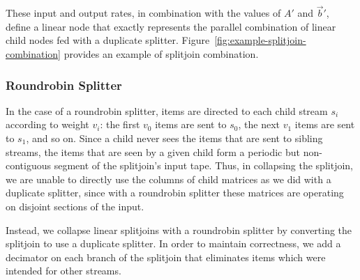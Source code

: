 \documentclass{sig-alternate}
\begin{document}
{These input and output rates, in combination with the values of $A'$
and $\vec{b}'$, define a linear node that exactly represents the
parallel combination of linear child nodes fed with a duplicate
splitter. Figure~\ref{fig:example-splitjoin-combination} provides an
example of splitjoin combination.



\subsubsection{Roundrobin Splitter}

In the case of a roundrobin splitter, items are directed to each child
stream $s_i$ according to weight $v_i$: the first $v_0$ items are sent
to $s_0$, the next $v_1$ items are sent to $s_1$, and so on.  Since a
child never sees the items that are sent to sibling streams, the items
that are seen by a given child form a periodic but non-contiguous
segment of the splitjoin's input tape.  Thus, in collapsing the
splitjoin, we are unable to directly use the columns of child matrices
as we did with a duplicate splitter, since with a roundrobin splitter
these matrices are operating on disjoint sections of the input.

Instead, we collapse linear splitjoins with a roundrobin splitter by
converting the splitjoin to use a duplicate splitter.  In order to
maintain correctness, we add a decimator on each branch
of the splitjoin that eliminates items which were intended for other
streams.

}
\end{document}
